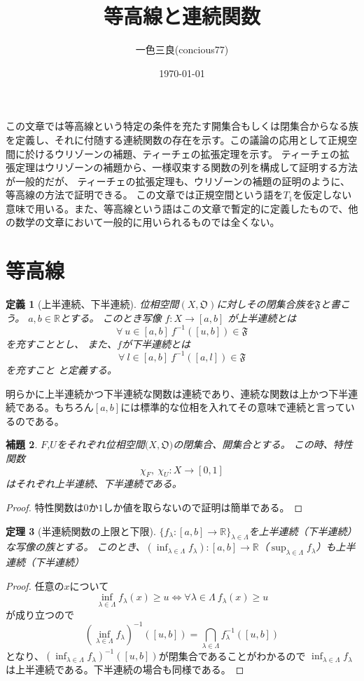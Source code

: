 \documentclass[leqno]{jsarticle}
\title{等高線と連続関数}
\author{一色三良(concious77)}
\date{\today}
\newtheorem{thm}{定理}
\newtheorem{lem}[thm]{補題}
\newtheorem{df}[thm]{定義}
\newcommand{\rr}{\mathbb{R}}
\begin{document}
\maketitle
この文章では等高線という特定の条件を充たす開集合もしくは閉集合からなる族を定義し、それに付随する連続関数の存在を示す。この議論の応用として正規空間に於けるウリゾーンの補題、ティーチェの拡張定理を示す。
ティーチェの拡張定理はウリゾーンの補題から、一様収束する関数の列を構成して証明する方法が一般的だが、
ティーチェの拡張定理も、ウリゾーンの補題の証明のように、等高線の方法で証明できる。
この文章では正規空間という語を$T_1$を仮定しない意味で用いる。また、等高線という語はこの文章で暫定的に定義したもので、他の数学の文章において一般的に用いられるものでは全くない。
\section{等高線}
\begin{df}[上半連続、下半連続]
位相空間$(X,\mathfrak{O})$に対しその閉集合族を$\mathfrak{F}$と書こう。
$a,b\in \rr$とする。
このとき写像
$f:X\rightarrow [a,b]$
が上半連続とは
\[
\forall \ u\in [a,b]\ f^{-1}([u,b])\in \mathfrak{F}
\]
を充すこととし、
また、$f$が下半連続とは
\[
\forall \ l\in [a,b]\ f^{-1}([a,l])\in \mathfrak{F}
\]
を充すこと
と定義する。
\end{df}

明らかに上半連続かつ下半連続な関数は連続であり、連続な関数は上かつ下半連続である。もちろん$[a,b]$には標準的な位相を入れてその意味で連続と言っているのである。
\begin{lem}\label{特性}
$F$,$U$をそれぞれ位相空間$(X,\mathfrak{O)}$の閉集合、開集合とする。
この時、特性関数
\[
\chi_{F},\ \chi_{U}:X\rightarrow [0,1]
\]はそれぞれ上半連続、下半連続である。
\end{lem}
\begin{proof}
特性関数は$0$か$1$しか値を取らないので証明は簡単である。
\end{proof}

\begin{thm}[半連続関数の上限と下限]\label{sup}
$\{f_{\lambda}:[a,b]\to \rr\}_{\lambda\in \Lambda}$を上半連続（下半連続）な写像の族とする。
このとき、$(\inf_{\lambda\in \Lambda}f_{\lambda}):[a,b]\to \rr$（$\sup_{\lambda\in \Lambda}f_{\lambda}$）も上半連続（下半連続）
\end{thm}
\begin{proof}
任意の$x$について
\[
\inf_{\lambda\in \Lambda}f_{\lambda}(x)\ge u \Leftrightarrow \forall \lambda \in \Lambda\ f_{\lambda}(x)\ge u
\]
が成り立つので
\[
(\inf_{\lambda\in \Lambda}f_{\lambda})^{-1}([u, b])=\bigcap_{\lambda\in \Lambda}f_{\lambda}^{-1}([u,b])
\]となり、$(\inf_{\lambda\in \Lambda}f_{\lambda})^{-1}([u, b])$が閉集合であることがわかるので
$\displaystyle{\inf_{\lambda\in \Lambda}f_{\lambda}}$は上半連続である。下半連続の場合も同様である。
\end{proof}
\end{document}
